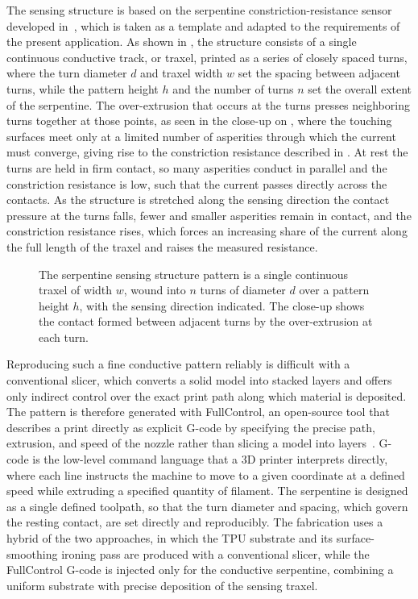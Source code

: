 The sensing structure is based on the serpentine constriction-resistance sensor developed in~\cite{G.O.A.T}, which is taken as a template and adapted to the requirements of the present application. As shown in , the structure consists of a single continuous conductive track, or traxel, printed as a series of closely spaced turns, where the turn diameter $d$ and traxel width $w$ set the spacing between adjacent turns, while the pattern height $h$ and the number of turns $n$ set the overall extent of the serpentine. 
The over-extrusion that occurs at the turns presses neighboring turns together at those points, as seen in the close-up on , where the touching surfaces meet only at a limited number of asperities through which the current must converge, giving rise to the constriction resistance described in . At rest the turns are held in firm contact, so many asperities conduct in parallel and the constriction resistance is low, such that the current passes directly across the contacts. As the structure is stretched along the sensing direction the contact pressure at the turns falls, fewer and smaller asperities remain in contact, and the constriction resistance rises, which forces an increasing share of the current along the full length of the traxel and raises the measured resistance.

\begin{figure}
\centering

    \caption{The serpentine sensing structure pattern is a single continuous traxel of width $w$, wound into $n$ turns of diameter $d$ over a pattern height $h$, with the sensing direction indicated. The close-up shows the contact formed between adjacent turns by the over-extrusion at each turn.}
    \label{fig:serpentine}
\end{figure}

Reproducing such a fine conductive pattern reliably is difficult with a conventional slicer, which converts a solid model into stacked layers and offers only indirect control over the exact print path along which material is deposited. The pattern is therefore generated with FullControl, an open-source tool that describes a print directly as explicit G-code by specifying the precise path, extrusion, and speed of the nozzle rather than slicing a model into layers~\cite{fullcontrol}. G-code is the low-level command language that a 3D printer interprets directly, where each line instructs the machine to move to a given coordinate at a defined speed while extruding a specified quantity of filament. The serpentine is designed as a single defined toolpath, so that the turn diameter and spacing, which govern the resting contact, are set directly and reproducibly. The fabrication uses a hybrid of the two approaches, in which the TPU substrate and its surface-smoothing ironing pass are produced with a conventional slicer, while the FullControl G-code is injected only for the conductive serpentine, combining a uniform substrate with precise deposition of the sensing traxel.

